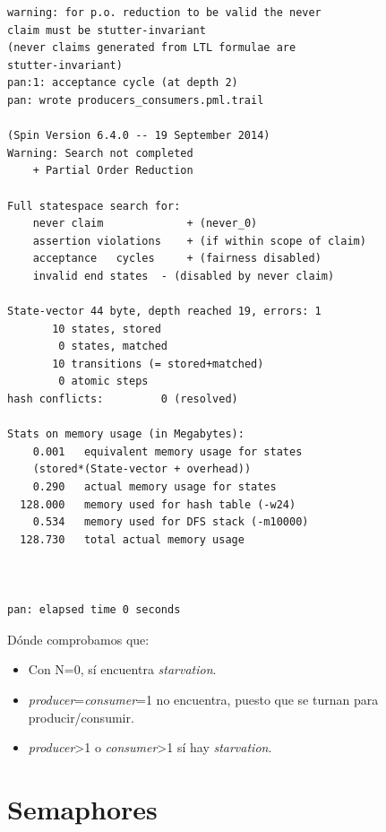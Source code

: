 \documentclass[a4paper,12pt]{article}
\begin{document}
\begin{lstlisting}[frame=single]
warning: for p.o. reduction to be valid the never 
claim must be stutter-invariant
(never claims generated from LTL formulae are 
stutter-invariant)
pan:1: acceptance cycle (at depth 2)
pan: wrote producers_consumers.pml.trail

(Spin Version 6.4.0 -- 19 September 2014)
Warning: Search not completed
	+ Partial Order Reduction

Full statespace search for:
	never claim         	+ (never_0)
	assertion violations	+ (if within scope of claim)
	acceptance   cycles 	+ (fairness disabled)
	invalid end states	- (disabled by never claim)

State-vector 44 byte, depth reached 19, errors: 1
       10 states, stored
        0 states, matched
       10 transitions (= stored+matched)
        0 atomic steps
hash conflicts:         0 (resolved)

Stats on memory usage (in Megabytes):
    0.001	equivalent memory usage for states 
    (stored*(State-vector + overhead))
    0.290	actual memory usage for states
  128.000	memory used for hash table (-w24)
    0.534	memory used for DFS stack (-m10000)
  128.730	total actual memory usage



pan: elapsed time 0 seconds

\end{lstlisting}
Dónde comprobamos que:

\begin{itemize}
\item Con N=0, sí encuentra \textit{starvation}.
\item \textit{producer}=\textit{consumer}=1 no encuentra, puesto que se turnan para producir/consumir.
\item \textit{producer}\textgreater 1 o \textit{consumer}\textgreater 1 sí hay \textit{starvation}.
\end{itemize}


\newpage
\section{Semaphores}
\end{document}
